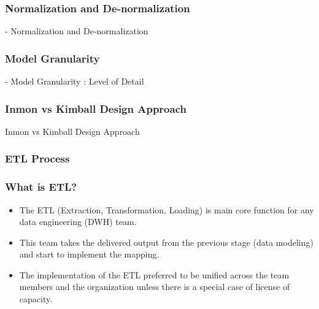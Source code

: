\begin{frame}
    \frametitle{Normalization and De-normalization}

    - Normalization and De-normalization\\
\end{frame}


\begin{frame}
    \frametitle{Model Granularity}

    - Model Granularity : Level of Detail\\
\end{frame}



\begin{frame}
    \frametitle{Inmon vs Kimball Design Approach }

    Inmon vs Kimball Design Approach

\end{frame}

\subsubsection{ETL Process}

\begin{frame}
    \frametitle{What is ETL?}

    \begin{itemize}[<+->]
        \item The ETL (Extraction, Transformation, Loading) is main core function for any data engineering (DWH) team.
        \item This team takes the delivered output from the previous stage (data modeling) and start to implement the mapping.
        \item The implementation of the ETL preferred to be unified across the team members and the organization unless there is a special case of license of capacity.

    \end{itemize}


\end{frame}

